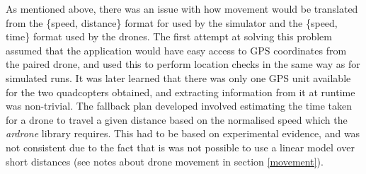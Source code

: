 As mentioned above, there was an issue with how movement would be translated from the \{speed, distance\} format for used by the simulator and the \{speed, time\} format used by the drones. The first attempt at solving this problem assumed that the application would have easy access to GPS coordinates from the paired drone, and used this to perform location checks in the same way as for simulated runs. It was later learned that there was only one GPS unit available for the two quadcopters obtained, and extracting information from it at runtime was non-trivial. The fallback plan developed involved estimating the time taken for a drone to travel a given distance based on the normalised speed which the \textit{ardrone} library requires. This had to be based on experimental evidence, and was not consistent due to the fact that is was not possible to use a linear model over short distances (see notes about drone movement in section \ref{movement}).

